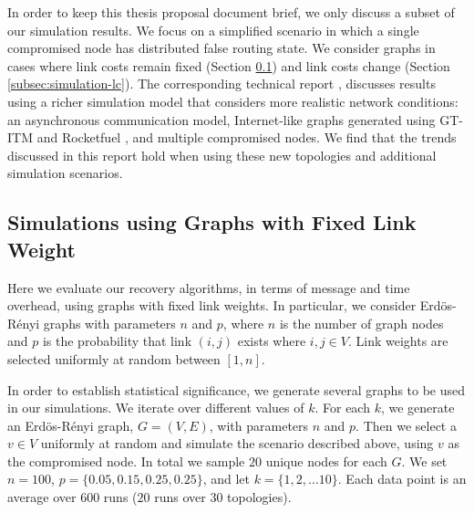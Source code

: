 In order to keep this thesis proposal document brief, we only discuss a subset of our simulation results.  We focus on a simplified scenario in which a single compromised node
has distributed false routing state.  We consider \er graphs in cases where link costs remain fixed (Section \ref{subsec:simulation-fixed}) and link costs change (Section \ref{subsec:simulation-lc}).
The corresponding technical report \cite{TechRollback10}, discusses results using a richer simulation model that considers more realistic network conditions: an asynchronous communication model,
Internet-like graphs generated using GT-ITM \cite{GT-ITM} and Rocketfuel \cite{Rocketfuel}, and multiple compromised nodes.  We find that the trends discussed in this report hold when using these new topologies and 
additional simulation scenarios.



\subsection{Simulations using Graphs with Fixed Link Weight}
\label{subsec:simulation-fixed}

Here we evaluate our recovery algorithms, in terms of message and time overhead, using \er graphs with fixed link weights. 
In particular, we consider Erd\"{o}s-R\'enyi graphs with parameters $n$ and $p$, where $n$ is the number of graph nodes and $p$ is the probability that link $(i,j)$ exists 
where $i,j \in V$. Link weights are selected uniformly at random between $[1,n]$.

In order to establish statistical significance, we generate several \er graphs to be used in our simulations. 
We iterate over different values of $k$. For each $k$, we  generate an Erd\"{o}s-R\'enyi graph, $G = (V,E)$, with parameters $n$ and $p$. Then we select a $v \in V$ uniformly at 
random and simulate the scenario described above, using $v$ as the compromised node. In total we sample $20$ unique nodes for each $G$.
We set $n=100$, $p=\{0.05,0.15,0.25, 0.25\}$, and let $k=\{1,2,... 10\}$. Each data point is an average over $600$ runs ($20$ runs over 
$30$ topologies).  

